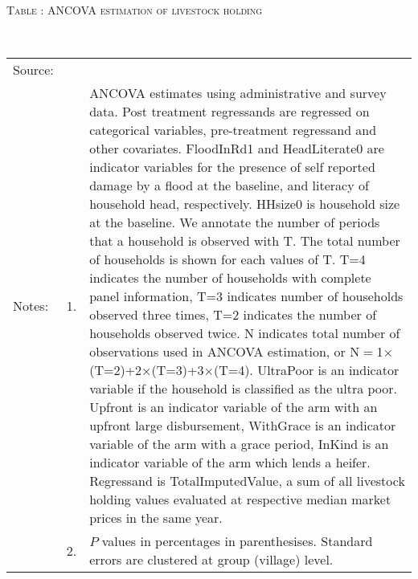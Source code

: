 \hspace{-1cm}\begin{minipage}[t]{14cm}
\hfil\textsc{\normalsize Table \thetable: ANCOVA estimation of livestock holding \label{tab ANCOVA livestock holding}}\\
\setlength{\tabcolsep}{1pt}
\setlength{\baselineskip}{8pt}
\renewcommand{\arraystretch}{.55}
\hfil{}\\
\renewcommand{\arraystretch}{.8}
\setlength{\tabcolsep}{1pt}
\begin{tabular}{>{\hfill\scriptsize}p{1cm}<{}>{\hfill\scriptsize}p{.25cm}<{}>{\scriptsize}p{12cm}<{\hfill}}
Source:& \multicolumn{2}{l}{\scriptsize Estimated with GUK administrative and survey data.}\\
Notes: & 1. & ANCOVA estimates using administrative and survey data. Post treatment regressands are regressed on categorical variables, pre-treatment regressand and other covariates. \textsf{FloodInRd1} and \textsf{HeadLiterate0} are indicator variables for the presence of self reported damage by a flood at the baseline, and literacy of household head, respectively. \textsf{HHsize0} is household size at the baseline. We annotate the number of periods that a household is observed with \textsf{T}. The total number of households is shown for each values of \textsf{T}. \textsf{T=4} indicates the number of households with complete panel information, \textsf{T=3} indicates number of households observed three times, \textsf{T=2} indicates the number of households observed twice. \textsf{N} indicates total number of observations used in ANCOVA estimation, or \textsf{N$=$1$\times$(T=2)+2$\times$(T=3)+3$\times$(T=4)}.  \textsf{UltraPoor} is an indicator variable if the household is classified as the ultra poor. \textsf{Upfront} is an indicator variable of the arm with an upfront large disbursement, \textsf{WithGrace} is an indicator variable of the arm with a grace period, \textsf{InKind} is an indicator variable of the arm which lends a heifer. Regressand is \textsf{TotalImputedValue}, a sum of all livestock holding values evaluated at respective median market prices in the same year. \\
& 2. & $P$ values in percentages in parenthesises. Standard errors are clustered at group (village) level.
\end{tabular}
\end{minipage}

